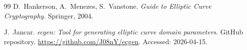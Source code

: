 \documentclass[12pt]{article}
\begin{document}
\hypersetup{pageanchor=false}

\clearpage
\hypersetup{pageanchor=true}
\setcounter{page}{2}
\tableofcontents
\clearpage

















\clearpage
{}
{}
\begin{thebibliography}{99}
D.~Hankerson, A.~Menezes, S.~Vanstone.
\textit{Guide to Elliptic Curve Cryptography}.
Springer, 2004.

J.~Jancar.
\textit{ecgen: Tool for generating elliptic curve domain parameters}.
GitHub repository.
\url{https://github.com/J08nY/ecgen}.
Accessed: 2026-04-15.
\end{thebibliography}
\end{document}
